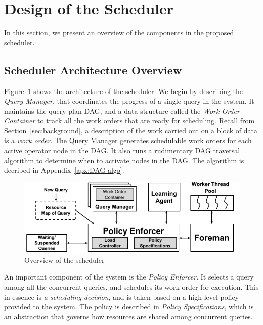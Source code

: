 \section{Design of the Scheduler}\label{sec:design}
In this section, we present an overview of the components in the proposed \sys{} scheduler.

\subsection{Scheduler Architecture Overview}\label{ssec:scheduler-arch}
Figure~\ref{fig:scheduler-architecture} shows the architecture of the \sys{} scheduler.
We begin by describing the \textit{Query Manager}, that coordinates the progress of a single query in the system.
It maintains the query plan DAG, and a data structure called
the \textit{Work Order Container} to track all the work orders that are ready for
scheduling. 
Recall from Section~\ref{sec:background}, a description of the work carried out on a block of data is a \textit{work order}. 
The Query Manager generates schedulable work orders for each active operator node in the DAG. 
It also runs a rudimentary DAG traversal algorithm to determine when to activate nodes in the DAG. 
The algorithm is decribed in Appendix~\ref{apx:DAG-algo}.

\begin{figure}[]
	\centering
	\includegraphics[width=\columnwidth]{policy/figures/Scheduler-Architecture.pdf}
	\vspace*{-1.5em}
	\caption{Overview of the scheduler}
	\label{fig:scheduler-architecture}
	\vspace*{-1.5em}
\end{figure}

An important component of the system is the \textit{Policy Enforcer}.
It selects a query among all the concurrent queries, and schedules its work order for execution. 
This in essence is \textit{a scheduling decision}, and is taken based on a high-level policy provided to the system.
The policy is described in \textit{Policy Specifications}, which is an
abstraction that governs how resources are shared among concurrent queries. 

